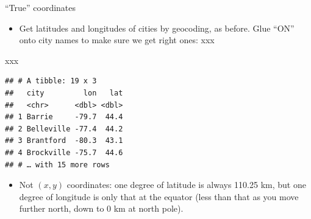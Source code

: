 \documentclass[ignorenonframetext,]{beamer}
\newenvironment{Shaded}{\begin{snugshade}}{\end{snugshade}}
\newcommand{\DataTypeTok}[1]{\textcolor[rgb]{0.13,0.29,0.53}{#1}}
\newcommand{\DecValTok}[1]{\textcolor[rgb]{0.00,0.00,0.81}{#1}}
\newcommand{\KeywordTok}[1]{\textcolor[rgb]{0.13,0.29,0.53}{\textbf{#1}}}
\newcommand{\NormalTok}[1]{#1}
\newcommand{\OperatorTok}[1]{\textcolor[rgb]{0.81,0.36,0.00}{\textbf{#1}}}
\newcommand{\StringTok}[1]{\textcolor[rgb]{0.31,0.60,0.02}{#1}}
\providecommand{\tightlist}{%
  \setlength{\itemsep}{0pt}\setlength{\parskip}{0pt}}
\begin{document}
\begin{frame}[fragile]{``True'' coordinates}
\protect\hypertarget{true-coordinates}{}

\begin{itemize}
\tightlist
\item
  Get latitudes and longitudes of cities by geocoding, as before. Glue
  ``ON'' onto city names to make sure we get right ones: xxx
\end{itemize}

\footnotesize

\begin{Shaded}
\end{Shaded}

\normalsize

xxx

\footnotesize

\begin{verbatim}
## # A tibble: 19 x 3
##   city         lon   lat
##   <chr>      <dbl> <dbl>
## 1 Barrie     -79.7  44.4
## 2 Belleville -77.4  44.2
## 3 Brantford  -80.3  43.1
## 4 Brockville -75.7  44.6
## # … with 15 more rows
\end{verbatim}

\normalsize

\begin{itemize}
\tightlist
\item
  Not \((x,y)\) coordinates: one degree of latitude is always 110.25 km,
  but one degree of longitude is only that at the equator (less than
  that as you move further north, down to 0 km at north pole).
\end{itemize}

\end{frame}
\end{document}
